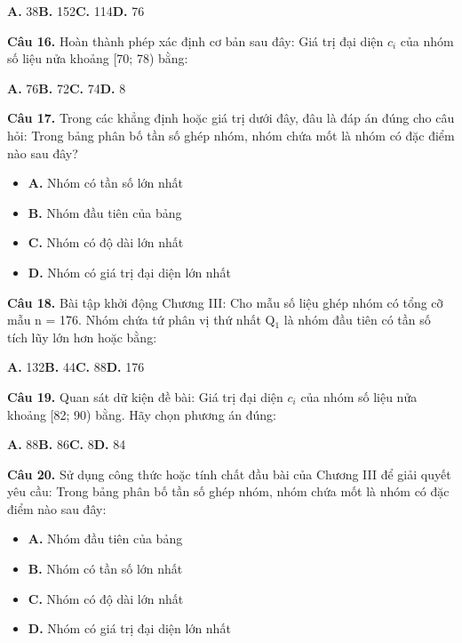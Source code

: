 \documentclass[11pt,a4paper]{article}
\begin{document}
\hspace*{1.5em}\textbf{A.} 38\quad\quad \textbf{B.} 152\quad\quad \textbf{C.} 114\quad\quad \textbf{D.} 76\par\vspace{2pt}
\textbf{\color{primary} Câu 16.} Hoàn thành phép xác định cơ bản sau đây: Giá trị đại diện $c_i$ của nhóm số liệu nửa khoảng [70; 78) bằng:\par
\hspace*{1.5em}\textbf{A.} 76\quad\quad \textbf{B.} 72\quad\quad \textbf{C.} 74\quad\quad \textbf{D.} 8\par\vspace{2pt}
\textbf{\color{primary} Câu 17.} Trong các khẳng định hoặc giá trị dưới đây, đâu là đáp án đúng cho câu hỏi: Trong bảng phân bố tần số ghép nhóm, nhóm chứa mốt là nhóm có đặc điểm nào sau đây?\par
\begin{itemize}\setlength{\itemsep}{1pt}\setlength{\parskip}{0pt}
  \item[] \textbf{A.} Nhóm có tần số lớn nhất
  \item[] \textbf{B.} Nhóm đầu tiên của bảng
  \item[] \textbf{C.} Nhóm có độ dài lớn nhất
  \item[] \textbf{D.} Nhóm có giá trị đại diện lớn nhất
\end{itemize}\vspace{2pt}
\textbf{\color{primary} Câu 18.} Bài tập khởi động Chương III: Cho mẫu số liệu ghép nhóm có tổng cỡ mẫu n = 176. Nhóm chứa tứ phân vị thứ nhất Q$_1$ là nhóm đầu tiên có tần số tích lũy lớn hơn hoặc bằng:\par
\hspace*{1.5em}\textbf{A.} 132\quad\quad \textbf{B.} 44\quad\quad \textbf{C.} 88\quad\quad \textbf{D.} 176\par\vspace{2pt}
\textbf{\color{primary} Câu 19.} Quan sát dữ kiện đề bài: Giá trị đại diện $c_i$ của nhóm số liệu nửa khoảng [82; 90) bằng. Hãy chọn phương án đúng:\par
\hspace*{1.5em}\textbf{A.} 88\quad\quad \textbf{B.} 86\quad\quad \textbf{C.} 8\quad\quad \textbf{D.} 84\par\vspace{2pt}
\textbf{\color{primary} Câu 20.} Sử dụng công thức hoặc tính chất đầu bài của Chương III để giải quyết yêu cầu: Trong bảng phân bố tần số ghép nhóm, nhóm chứa mốt là nhóm có đặc điểm nào sau đây:\par
\begin{itemize}\setlength{\itemsep}{1pt}\setlength{\parskip}{0pt}
  \item[] \textbf{A.} Nhóm đầu tiên của bảng
  \item[] \textbf{B.} Nhóm có tần số lớn nhất
  \item[] \textbf{C.} Nhóm có độ dài lớn nhất
  \item[] \textbf{D.} Nhóm có giá trị đại diện lớn nhất
\end{itemize}\vspace{2pt}
\end{document}
